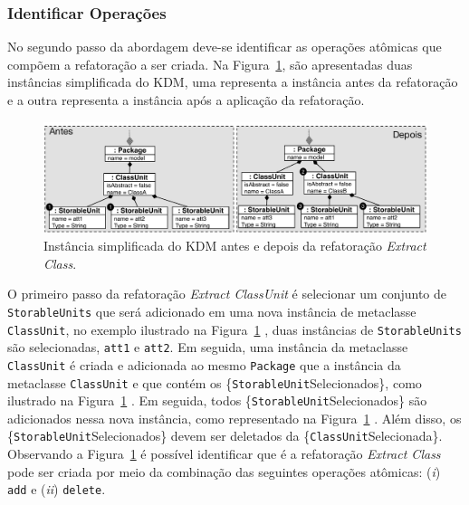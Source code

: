 \subsubsection{Identificar Operações}

No segundo passo da abordagem deve-se identificar as operações atômicas que compõem a refatoração a ser criada. Na Figura~\ref{fig:antes_e_depois_extract_ClassUnit}, são apresentadas duas instâncias simplificada do KDM, uma representa a instância antes da refatoração e a outra representa a instância após a aplicação da refatoração. 

\begin{figure}[h]
	\centering
	\caption{Instância simplificada do KDM antes e depois da refatoração \textit{Extract Class}.}
	\label{fig:antes_e_depois_extract_ClassUnit}
	\includegraphics[scale=0.6]{images/extractClassUnitAntesEDepois2}
	\fautor
\end{figure}

O primeiro passo da refatoração \textit{Extract ClassUnit} é selecionar um conjunto de \texttt{StorableUnits} que será adicionado em uma nova instância de metaclasse \texttt{ClassUnit}, no exemplo ilustrado na Figura~\ref{fig:antes_e_depois_extract_ClassUnit} , duas instâncias de \texttt{StorableUnits} são selecionadas, \texttt{att1} e \texttt{att2}. Em seguida, uma instância da metaclasse \texttt{ClassUnit} é criada e adicionada ao mesmo \texttt{Package} que a instância da metaclasse \texttt{ClassUnit} e que contém os \{\texttt{StorableUnit}Selecionados\}, como ilustrado na Figura~\ref{fig:antes_e_depois_extract_ClassUnit} . Em seguida, todos \{\texttt{StorableUnit}Selecionados\} são adicionados nessa nova instância, como representado na Figura~\ref{fig:antes_e_depois_extract_ClassUnit} . Além disso, os \{\texttt{StorableUnit}Selecionados\} devem ser deletados da \{\texttt{ClassUnit}Selecionada\}. Observando a Figura~\ref{fig:antes_e_depois_extract_ClassUnit} é possível identificar que é a refatoração \textit{Extract Class} pode ser criada por meio da combinação das seguintes operações atômicas: (\textit{i}) \texttt{add} e (\textit{ii}) \texttt{delete}. 

